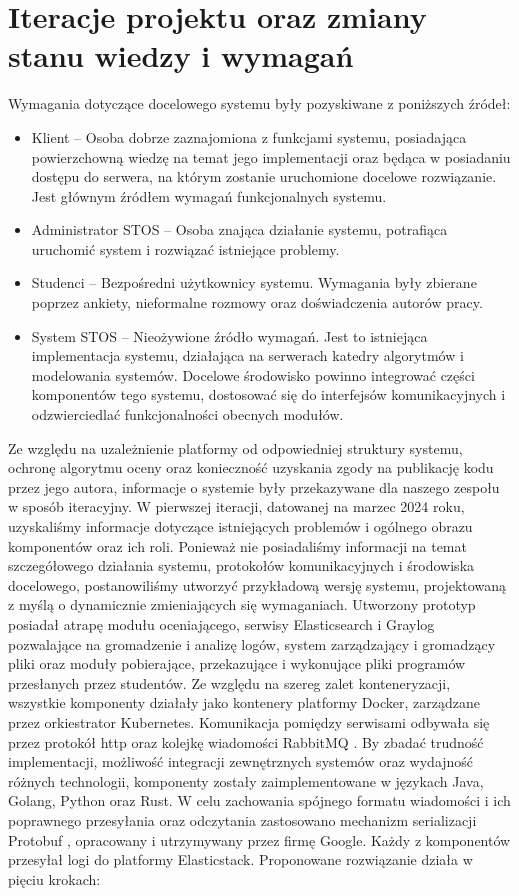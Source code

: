 \section{Iteracje projektu oraz zmiany stanu wiedzy i wymagań}
Wymagania dotyczące docelowego systemu były pozyskiwane z poniższych źródeł:
\begin{itemize}
    \item Klient -- Osoba dobrze zaznajomiona z funkcjami systemu, posiadająca powierzchowną wiedzę na temat jego implementacji oraz będąca w posiadaniu dostępu do serwera, na którym zostanie uruchomione docelowe rozwiązanie. Jest głównym źródłem wymagań funkcjonalnych systemu.
    \item Administrator STOS -- Osoba znająca działanie systemu, potrafiąca uruchomić system i rozwiązać istniejące problemy.
    \item Studenci -- Bezpośredni użytkownicy systemu. Wymagania były zbierane poprzez ankiety, nieformalne rozmowy oraz doświadczenia autorów pracy.
    \item System STOS -- Nieożywione źródło wymagań. Jest to istniejąca implementacja systemu, działająca na serwerach katedry algorytmów i modelowania systemów. Docelowe środowisko powinno  integrować części komponentów tego systemu, dostosować się do interfejsów komunikacyjnych i odzwierciedlać funkcjonalności obecnych modułów.
\end{itemize}
Ze względu na uzależnienie platformy od odpowiedniej struktury systemu, ochronę algorytmu oceny oraz konieczność uzyskania zgody na publikację kodu przez jego autora, informacje o systemie były przekazywane dla naszego zespołu w sposób iteracyjny.
\newline \indent W pierwszej iteracji, datowanej na marzec 2024 roku, uzyskaliśmy informacje dotyczące istniejących problemów i ogólnego obrazu komponentów oraz ich roli. Ponieważ nie posiadaliśmy informacji na temat szczegółowego działania systemu, protokołów komunikacyjnych i środowiska docelowego, postanowiliśmy utworzyć przykładową wersję systemu, projektowaną z myślą o dynamicznie zmieniających się wymaganiach. Utworzony prototyp posiadał atrapę modułu oceniającego, serwisy Elasticsearch i Graylog pozwalające na gromadzenie i analizę logów, system zarządzający i gromadzący pliki oraz moduły pobierające, przekazujące i wykonujące pliki programów przesłanych przez studentów. Ze względu na szereg zalet konteneryzacji, wszystkie komponenty działały jako kontenery platformy Docker, zarządzane przez orkiestrator Kubernetes. Komunikacja pomiędzy serwisami odbywała się przez protokół http oraz kolejkę wiadomości RabbitMQ \cite{rabbit}. By zbadać trudność implementacji, możliwość integracji zewnętrznych systemów oraz wydajność różnych technologii, komponenty zostały zaimplementowane w językach Java, Golang, Python oraz Rust. W celu zachowania spójnego formatu wiadomości i ich poprawnego przesyłania oraz odczytania zastosowano mechanizm serializacji Protobuf \cite{protobuf}, opracowany i utrzymywany przez firmę Google. Każdy z komponentów przesyłał logi do platformy Elasticstack. Proponowane rozwiązanie działa w pięciu krokach:
